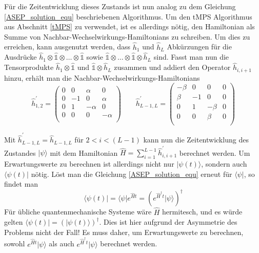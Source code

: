 \documentclass[10pt,a4paper]{report}
\begin{document}
Für die Zeitentwicklung dieses Zustands ist nun analog zu dem Gleichung \ref{ASEP_solution_equ} beschriebenen Algorithmus. Um den tMPS Algorithmus aus Abschnitt \ref{tMPS} zu verwendet, ist es allerdings nötig, den Hamiltonian als Summe von Nachbar-Wechselwirkungs-Hamiltonians zu schreiben. Um dies zu erreichen, kann ausgenutzt werden, dass $\hat{h}_1$ und $\hat{h}_L$ Abkürzungen für die Ausdrücke $\hat{h}_1\otimes\hat{\mathbb{1}}\otimes\ldots\otimes\hat{\mathbb{1}}$ sowie $\hat{\mathbb{1}}\otimes\ldots\otimes\hat{\mathbb{1}}\otimes\hat{h}_L$ sind. Fasst man nun die Tensorprodukte $\hat{h}_1\otimes\hat{\mathbb{1}}$ und $\hat{\mathbb{1}}\otimes\hat{h}_L$ zusammen und addiert den Operator $\hat{h}_{i,i+1}$ hinzu, erhält man die Nachbar-Wechselwirkungs-Hamiltonians
\begin{equation}
\hat{h}_{1,2}^\prime=
\begin{pmatrix}
0&0&\alpha&0\\
0&-1&0&\alpha\\
0&1&-\alpha&0\\
0&0&0&-\alpha\\
\end{pmatrix}
\qquad
\hat{h}_{L-1,L}^\prime=
\begin{pmatrix}
-\beta&0&0&0\\
\beta&-1&0&0\\
0&1&-\beta&0\\
0&0&\beta&0\\
\end{pmatrix}
\end{equation} 

Mit $\hat{h}_{L-1,L}^\prime=\hat{h}_{L-1,L}$ für $2<i<(L-1)$ kann nun die Zeitentwicklung des Zustandes $|\psi\rangle$ mit dem Hamiltonian $\hat{H}=\sum_{i=1}^{L-1} \hat{h}_{i,i+1}^\prime$ berechnet werden. Um Erwartungswerte zu berechnen ist allerdings nicht nur $|\psi(t)\rangle$, sondern auch $\langle\psi(t)|$ nötig. Löst man die Gleichung \ref{ASEP_solution_equ} erneut für $\langle\psi|$, so findet man
\begin{equation}
\langle\psi(t)|=\langle\psi|e^{\hat{H}t}=(e^{\hat{H}^\dagger t}|\psi\rangle)^\dagger
\end{equation}
Für übliche quantenmechanische Systeme wäre $\hat{H}$ hermitesch, und es würde gelten $\langle\psi(t)|=(|\psi(t)\rangle)^\dagger$. Dies ist hier aufgrund der Asymmetrie des Problems nicht der Fall! Es muss daher, um Erwartungswerte zu berechnen, sowohl $e^{\hat{H} t}|\psi\rangle$ als auch $e^{\hat{H}^\dagger t}|\psi\rangle$ berechnet werden.\\
\end{document}
